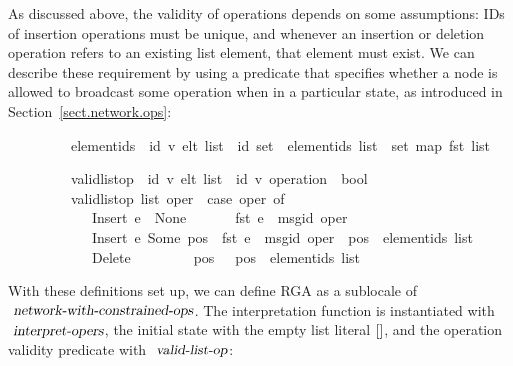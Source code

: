 As discussed above, the validity of operations depends on some assumptions: IDs of insertion operations must be unique, and whenever an insertion or deletion operation refers to an existing list element, that element must exist.
We can describe these requirement by using a predicate that specifies whether a node is allowed to broadcast some operation when in a particular state, as introduced in Section~\ref{sect.network.ops}:
\vspace{0.35em}
\begin{isabellebody}
\ \ \ \ \ \ \ \ \ element{\isacharunderscore}ids\ {\isacharcolon}{\isacharcolon}\ {\isachardoublequoteopen}{\isacharparenleft}{\isacharprime}id{\isacharcomma}\ {\isacharprime}v{\isacharparenright}\ elt\ list\ {\isasymRightarrow}\ {\isacharprime}id\ set{\isachardoublequoteclose}\ \ {\isachardoublequoteopen}element{\isacharunderscore}ids\ list\ {\isasymequiv}\ set\ {\isacharparenleft}map\ fst\ list{\isacharparenright}{\isachardoublequoteclose}
\end{isabellebody}
\vspace{0.35em}
\begin{isabellebody}
\ \ \ \ \ \ \ \ \ valid{\isacharunderscore}list{\isacharunderscore}op\ {\isacharcolon}{\isacharcolon}\ {\isachardoublequoteopen}{\isacharparenleft}{\isacharprime}id{\isacharcomma}\ {\isacharprime}v{\isacharparenright}\ elt\ list\ {\isasymRightarrow}\ {\isacharparenleft}{\isacharprime}id{\isacharcomma}\ {\isacharprime}v{\isacharparenright}\ operation\ {\isasymRightarrow}\ bool{\isachardoublequoteclose}\ \isanewline
\ \ \ \ \ \ \ \ \ {\isachardoublequoteopen}valid{\isacharunderscore}list{\isacharunderscore}op\ list\ oper\ {\isasymequiv}\ case\ oper\ of\isanewline
\ \ \ \ \ \ \ \ \ \ \ \ Insert\ e\ \ None\ \ \ \ \ \ {\isasymRightarrow}\ fst\ e\ {\isacharequal}\ msg{\isacharunderscore}id\ oper\ {\isacharbar}\isanewline
\ \ \ \ \ \ \ \ \ \ \ \ Insert\ e\ {\isacharparenleft}Some\ pos{\isacharparenright}\ {\isasymRightarrow}\ fst\ e\ {\isacharequal}\ msg{\isacharunderscore}id\ oper\ {\isasymand}\ pos\ {\isasymin}\ element{\isacharunderscore}ids\ list\ {\isacharbar}\isanewline
\ \ \ \ \ \ \ \ \ \ \ \ Delete\ \ \ \ \ \ \ \ \ pos\ \ {\isasymRightarrow}\ pos\ {\isasymin}\ element{\isacharunderscore}ids\ list{\isachardoublequoteclose}
\end{isabellebody}
\vspace{0.35em}
With these definitions set up, we can define RGA as a sublocale of $\isa{network-with-constrained-ops}$. The interpretation function is instantiated with $\isa{interpret-opers}$, the initial state with the empty list literal $\emph{$[$}\emph{$]$}$, and the operation validity predicate with $\isa{valid-list-op}$:

